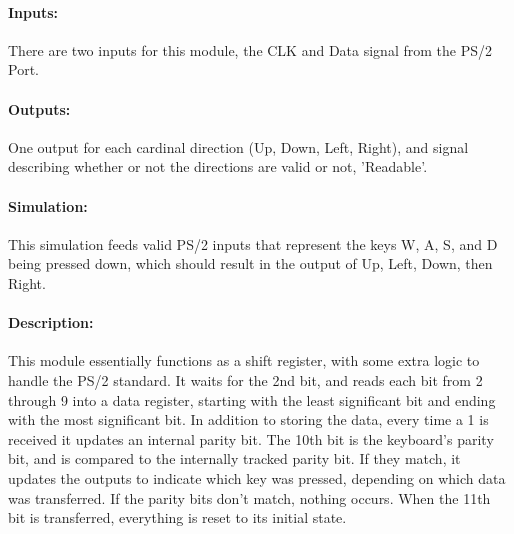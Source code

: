 \documentclass[]{article}
\begin{document}
\paragraph{Inputs:} There are two inputs for this module, the CLK and Data signal from the PS/2 Port.
\paragraph{Outputs:} One output for each cardinal direction (Up, Down, Left, Right), and signal describing whether or not the directions are valid or not, 'Readable'.
\paragraph{Simulation:} This simulation feeds valid PS/2 inputs that represent the keys W, A, S, and D being pressed down, which should result in the output of Up, Left, Down, then Right.
\paragraph{Description:} This module essentially functions as a shift register, with some extra logic to handle the PS/2 standard.  It waits for the 2nd bit, and reads each bit from 2 through 9 into a data register, starting with the least significant bit and ending with the most significant bit.  In addition to storing the data, every time a 1 is received it updates an internal parity bit.  The 10th bit is the keyboard's parity bit, and is compared to the internally tracked parity bit.  If they match, it updates the outputs to indicate which key was pressed, depending on which data was transferred.  If the parity bits don't match, nothing occurs.  When the 11th bit is transferred, everything is reset to its initial state.
\end{document}
